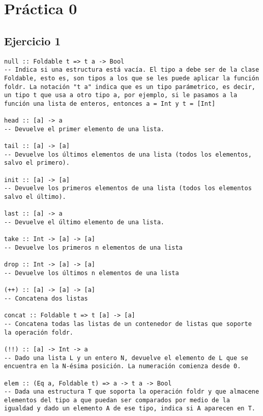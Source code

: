 \section{Práctica 0}

\subsection{Ejercicio 1}
\begin{centrado}
\begin{verbatim}
null :: Foldable t => t a -> Bool 
-- Indica si una estructura está vacía. El tipo a debe ser de la clase Foldable, esto es, son tipos a los que se les puede aplicar la función foldr. La notación "t a" indica que es un tipo parámetrico, es decir, un tipo t que usa a otro tipo a, por ejemplo, si le pasamos a la función una lista de enteros, entonces a = Int y t = [Int]

head :: [a] -> a
-- Devuelve el primer elemento de una lista.

tail :: [a] -> [a]
-- Devuelve los últimos elementos de una lista (todos los elementos, salvo el primero).

init :: [a] -> [a]
-- Devuelve los primeros elementos de una lista (todos los elementos salvo el último).

last :: [a] -> a
-- Devuelve el último elemento de una lista.

take :: Int -> [a] -> [a]
-- Devuelve los primeros n elementos de una lista

drop :: Int -> [a] -> [a]
-- Devuelve los últimos n elementos de una lista

(++) :: [a] -> [a] -> [a]
-- Concatena dos listas

concat :: Foldable t => t [a] -> [a]
-- Concatena todas las listas de un contenedor de listas que soporte la operación foldr.

(!!) :: [a] -> Int -> a
-- Dado una lista L y un entero N, devuelve el elemento de L que se encuentra en la N-ésima posición. La numeración comienza desde 0.

elem :: (Eq a, Foldable t) => a -> t a -> Bool
-- Dada una estructura T que soporta la operación foldr y que almacene elementos del tipo a que puedan ser comparados por medio de la igualdad y dado un elemento A de ese tipo, indica si A aparecen en T.

\end{verbatim}
\end{centrado}

\newpage
